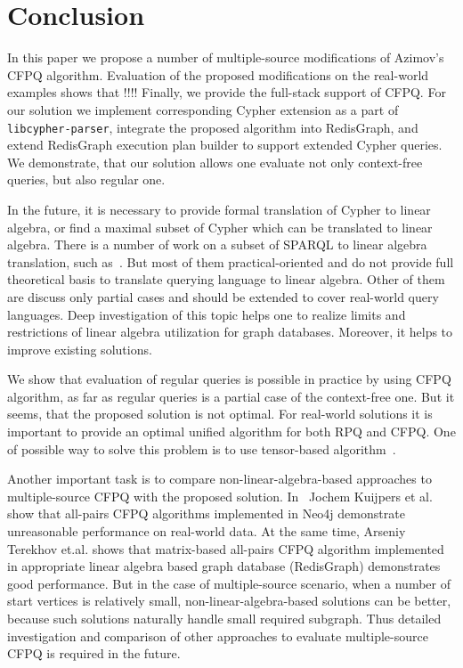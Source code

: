 \section{Conclusion}

In this paper we propose a number of multiple-source modifications of Azimov's CFPQ algorithm.
Evaluation of the proposed modifications on the real-world examples shows that !!!!
Finally, we provide the full-stack support of CFPQ.
For our solution we implement corresponding Cypher extension as a part of \texttt{libcypher-parser}, integrate the proposed algorithm into RedisGraph, and extend RedisGraph execution plan builder to support extended Cypher queries.
We demonstrate, that our solution allows one evaluate not only context-free queries, but also regular one.

In the future, it is necessary to provide formal translation of Cypher to linear algebra, or find a maximal subset of Cypher which can be translated to linear algebra.
There is a number of work on a subset of SPARQL to linear algebra translation, such as~\cite{10.14778/3229863.3236239,10.1007/978-3-642-34002-4_36,10.1145/3302424.3303962,DBLP:journals/corr/MetzlerM15a}.
But most of them practical-oriented and do not provide full theoretical basis to translate querying language to linear algebra.
Other of them are discuss only partial cases and should be extended to cover real-world query languages. 
Deep investigation of this topic helps one to realize limits and restrictions of linear algebra utilization for graph databases.
Moreover, it helps to improve existing solutions.

We show that evaluation of regular queries is possible in practice by using CFPQ algorithm, as far as regular queries is a partial case of the context-free one.
But it seems, that the proposed solution is not optimal. 
For real-world solutions it is important to provide an optimal unified algorithm for both RPQ and CFPQ.
One of possible way to solve this problem is to use tensor-based algorithm~\cite{10.1007/978-3-030-54832-2_6}.

Another important task is to compare non-linear-algebra-based approaches to multiple-source CFPQ with the proposed solution. 
In~\cite{Kuijpers:2019:ESC:3335783.3335791} Jochem Kuijpers et al. show that all-pairs CFPQ algorithms implemented in Neo4j demonstrate unreasonable performance on real-world data.
At the same time, Arseniy Terekhov et.al. shows that matrix-based all-pairs CFPQ algorithm implemented in appropriate linear algebra based graph database (RedisGraph) demonstrates good performance.
But in the case of multiple-source scenario, when a number of start vertices is relatively small, non-linear-algebra-based solutions can be better, because such solutions naturally handle small required subgraph.
Thus detailed investigation and comparison of other approaches to evaluate multiple-source CFPQ is required in the future.